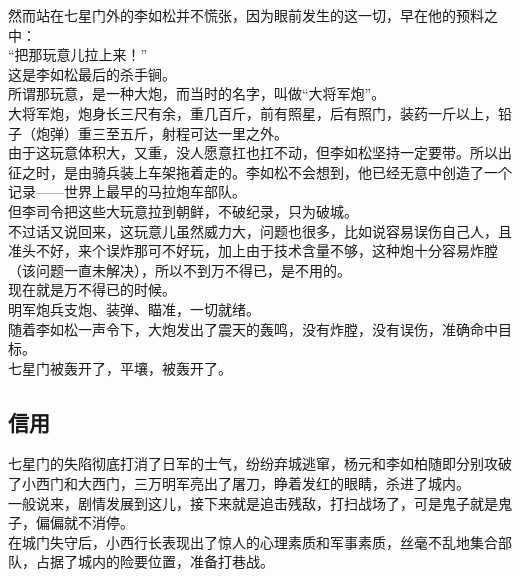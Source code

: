\begin{multicols}{\theparacolNo}
然而站在七星门外的李如松并不慌张，因为眼前发生的这一切，早在他的预料之中：\\

“把那玩意儿拉上来！”\\

这是李如松最后的杀手锏。\\

所谓那玩意，是一种大炮，而当时的名字，叫做“大将军炮”。\\

大将军炮，炮身长三尺有余，重几百斤，前有照星，后有照门，装药一斤以上，铅子（炮弹）重三至五斤，射程可达一里之外。\\

由于这玩意体积大，又重，没人愿意扛也扛不动，但李如松坚持一定要带。所以出征之时，是由骑兵装上车架拖着走的。李如松不会想到，他已经无意中创造了一个记录——世界上最早的马拉炮车部队。\\

但李司令把这些大玩意拉到朝鲜，不破纪录，只为破城。\\

不过话又说回来，这玩意儿虽然威力大，问题也很多，比如说容易误伤自己人，且准头不好，来个误炸那可不好玩，加上由于技术含量不够，这种炮十分容易炸膛（该问题一直未解决），所以不到万不得已，是不用的。\\

现在就是万不得已的时候。\\

明军炮兵支炮、装弹、瞄准，一切就绪。\\

随着李如松一声令下，大炮发出了震天的轰鸣，没有炸膛，没有误伤，准确命中目标。\\

七星门被轰开了，平壤，被轰开了。\\

\subsection{信用}
七星门的失陷彻底打消了日军的士气，纷纷弃城逃窜，杨元和李如柏随即分别攻破了小西门和大西门，三万明军亮出了屠刀，睁着发红的眼睛，杀进了城内。\\

一般说来，剧情发展到这儿，接下来就是追击残敌，打扫战场了，可是鬼子就是鬼子，偏偏就不消停。\\

在城门失守后，小西行长表现出了惊人的心理素质和军事素质，丝毫不乱地集合部队，占据了城内的险要位置，准备打巷战。\\


\end{multicols}
